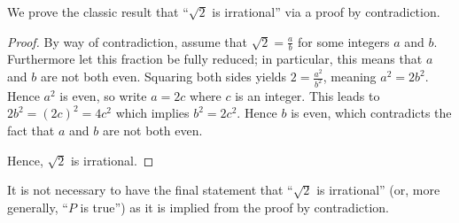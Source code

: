 \begin{example}\label{example-sqrt2-is-irrational}
    We prove the classic result that ``$\sqrt 2$ is irrational'' via a proof by contradiction.
    \begin{proof}
        By way of contradiction, assume that $\sqrt2 = \frac ab$ for some integers $a$ and $b$. Furthermore let this fraction be fully reduced; in particular, this means that $a$ and $b$ are not both even. Squaring both sides yields $2 = \frac{a^2}{b^2}$, meaning  $a^2 = 2b^2$. Hence $a^2$ is even, so write $a = 2c$ where $c$ is an integer. This leads to $2b^2 = (2c)^2 = 4c^2$ which implies $b^2 = 2c^2$. Hence $b$ is even, which contradicts the fact that $a$ and $b$ are not both even.
        
        Hence, $\sqrt 2$ is irrational.
    \end{proof}
\end{example}
\begin{remark}
    It is not necessary to have the final statement that ``$\sqrt 2$ is irrational'' (or, more generally, ``$P$ is true'') as it is implied from the proof by contradiction.
\end{remark}

